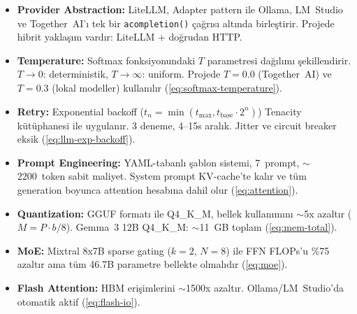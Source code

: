 
\begin{ozet}
\begin{itemize}[leftmargin=1.5em]
  \item \textbf{Provider Abstraction:} LiteLLM, Adapter pattern ile Ollama, LM~Studio ve Together~AI'{\i} tek bir \texttt{acompletion()} \c{c}a\u{g}r{\i}s{\i} alt{\i}nda birle\c{s}tirir. Projede hibrit yakla\c{s}{\i}m vard{\i}r: LiteLLM + do\u{g}rudan HTTP.

  \item \textbf{Temperature:} Softmax fonksiyonundaki $T$ parametresi da\u{g}{\i}l{\i}m{\i} \c{s}ekillendirir. $T \to 0$: deterministik, $T \to \infty$: uniform. Projede $T{=}0.0$ (Together~AI) ve $T{=}0.3$ (lokal modeller) kullan{\i}l{\i}r (\cref{eq:softmax-temperature}).

  \item \textbf{Retry:} Exponential backoff ($t_n = \min(t_{\max}, t_{\text{base}} \cdot 2^n)$) Tenacity k\"{u}t\"{u}phanesi ile uygulan{\i}r. 3 deneme, 4--15s aral{\i}k. Jitter ve circuit breaker eksik (\cref{eq:llm-exp-backoff}).

  \item \textbf{Prompt Engineering:} YAML-tabanl{\i} \c{s}ablon sistemi, 7~prompt, $\sim$2200~token sabit maliyet. System prompt KV-cache'te kal{\i}r ve t\"{u}m generation boyunca attention hesab{\i}na dahil olur (\cref{eq:attention}).

  \item \textbf{Quantization:} GGUF format{\i} ile Q4\_K\_M, bellek kullan{\i}m{\i}n{\i} $\sim$5x azalt{\i}r ($M = P \cdot b / 8$). Gemma~3 12B Q4\_K\_M: $\sim$11~GB toplam (\cref{eq:mem-total}).

  \item \textbf{MoE:} Mixtral 8x7B sparse gating ($k{=}2$, $N{=}8$) ile FFN FLOPs'u \%75 azalt{\i}r ama t\"{u}m 46.7B parametre bellekte olmal{\i}d{\i}r (\cref{eq:moe}).

  \item \textbf{Flash Attention:} HBM eri\c{s}imlerini $\sim$1500x azalt{\i}r. Ollama/LM~Studio'da otomatik aktif (\cref{eq:flash-io}).
\end{itemize}
\end{ozet}
